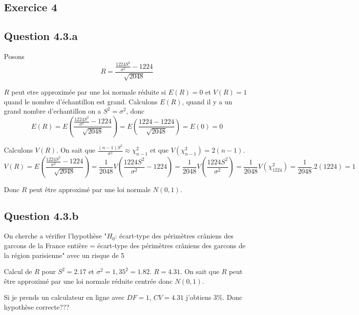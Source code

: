 \documentclass[]{book}
\theoremstyle{definition}
\begin{document}
\subsection*{Exercice 4}
\subsection*{Question 4.3.a}
Posons 
$$R = \frac{\frac{1224S^2}{\sigma^2}-1224}{\sqrt{2048}}$$

$R$ peut etre approxim\'ee par une loi normale r\'eduite si $E(R) = 0$ et $V(R) = 1$ quand le nombre d'\'echantillon est grand.
Calculons $E(R)$, quand il y a un grand nombre d'echantillon on a $S^2=\sigma^2$, donc 
$$
E(R) = E\left( \frac{\frac{1224S^2}{\sigma^2}-1224}{\sqrt{2048}}\right) = E(\frac{1224 -1224}{\sqrt{2048}}) = E(0) = 0
$$

Calculons $V(R)$. On sait que $\frac{(n-1)S^2}{\sigma^2} \approx \chi^2_{n-1}$ et que $V(\chi^2_{n-1}) = 2(n-1)$.
$$
V(R) = E\left( \frac{\frac{1224S^2}{\sigma^2}-1224}{\sqrt{2048}}\right) = \frac{1}{2048}V(\frac{1224S^2}{\sigma^2}-1224) = \frac{1}{2048}V(\frac{1224S^2}{\sigma^2}) = \frac{1}{2048}V(\chi^2_{1224}) = \frac{1}{2048}.2(1224) = 1
$$

Donc $R$ peut \^etre approxim\'e par une loi normale $N(0,1)$.

\subsection*{Question 4.3.b}
On cherche a v\'erifier l'hypoth\`ese "$H_0$: \'ecart-type des p\'erim\`etres cr\^aniens des garcons de la France enti\`ere = \'ecart-type des p\'erim\`etres cr\^aniens des garcons de la r\'egion parisienne" avec un risque de 5%

Calcul de $R$ pour $S^2 = 2.17$ et $\sigma^2 = 1,35^2 = 1.82$. $R = 4.31$.
On sait que $R$ peut \^etre approxim\'e par une loi normale r\'eduite centr\'ee donc $N(0,1)$.

Si je prends un calculateur en ligne avec $DF = 1$, $CV=4.31$ j'obtiens $3\%$. Donc hypoth\`ese correcte???  
\end{document}
